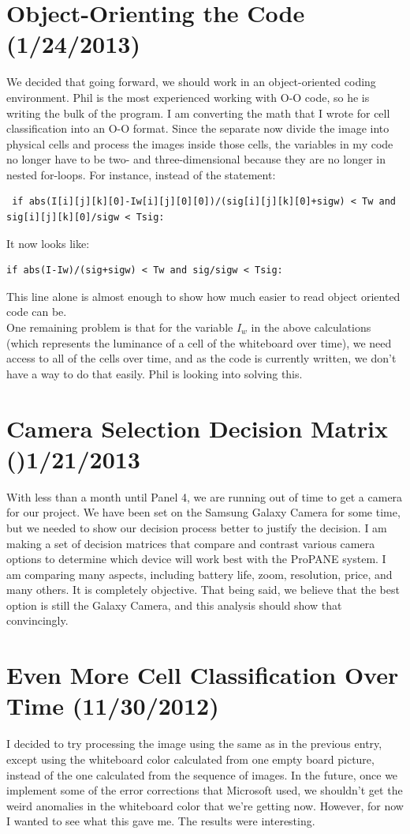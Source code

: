 \documentclass[]{article}
\begin{document}
	\section{Object-Orienting the Code (1/24/2013)}	
		We decided that going forward, we should work in an object-oriented coding environment.  Phil is the most experienced working with O-O code, so he is writing the bulk of the program.  I am converting the math that I wrote for cell classification into an O-O format.  Since the separate now divide the image into physical cells and process the images inside those cells, the variables in my code no longer have to be two- and three-dimensional because they are no longer in nested for-loops.  For instance, instead of the statement:
\begin{verbatim}
 if abs(I[i][j][k][0]-Iw[i][j][0][0])/(sig[i][j][k][0]+sigw) < Tw and sig[i][j][k][0]/sigw < Tsig:
\end{verbatim}
It now looks like:
\begin{verbatim}
if abs(I-Iw)/(sig+sigw) < Tw and sig/sigw < Tsig:
\end{verbatim}
This line alone is almost enough to show how much easier to read object oriented code can be.  
\\
One remaining problem is that for the variable $I_w$ in the above calculations (which represents the luminance of a cell of the whiteboard over time), we need access to all of the cells over time, and as the code is currently written, we don't have a way to do that easily. Phil is looking into solving this.
	
	\section{Camera Selection Decision Matrix ()1/21/2013}
		With less than a month until Panel 4, we are running out of time to get a camera for our project.  We have been set on the Samsung Galaxy Camera for some time, but we needed to show our decision process better to justify the decision.  I am making a set of decision matrices that compare and contrast various camera options to determine which device will work best with the ProPANE system.  I am comparing many aspects, including battery life, zoom, resolution, price, and many others.  It is completely objective.  That being said, we believe that the best option is still the Galaxy Camera, and this analysis should show that convincingly.
	
	\section{Even More Cell Classification Over Time (11/30/2012)}
		I decided to try processing the image using the same as in the previous entry, except using the whiteboard color calculated from one empty board picture, instead of the one calculated from the sequence of images.  In the future, once we implement some of the error corrections that Microsoft used, we shouldn't get the weird anomalies in the whiteboard color that we're getting now.  However, for now I wanted to see what this gave me.  The results were interesting.  \\
		 	
\end{document}
